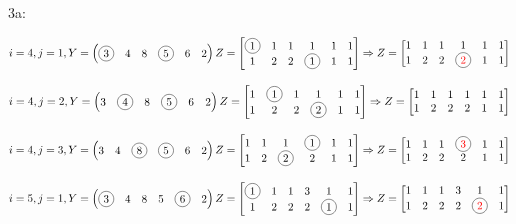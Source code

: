 \begin{example}{}{}
	3a:

	$i = 4, j = 1, Y = \begin{pmatrix} \circled{3} & 4 & 8 & \circled{5} & 6 & 2 \end{pmatrix} \\
	Z = \begin{bmatrix}
		\circled{1} & 1 & 1 & 1 & 1 & 1 \\
		1 & 2 & 2 & \circled{1} & 1 & 1
	\end{bmatrix} \Rightarrow Z = \begin{bmatrix}
		1 & 1 & 1 & 1 & 1 & 1 \\
		1 & 2 & 2 & \circled{\textcolor{red}{2}} & 1 & 1
	\end{bmatrix}$

	$i = 4, j = 2, Y = \begin{pmatrix} 3 & \circled{4} & 8 & \circled{5} & 6 & 2 \end{pmatrix} \\
	Z = \begin{bmatrix}
		1 & \circled{1} & 1 & 1 & 1 & 1 \\
		1 & 2 & 2 & \circled{2} & 1 & 1
	\end{bmatrix} \Rightarrow Z = \begin{bmatrix}
		1 & 1 & 1 & 1 & 1 & 1 \\
		1 & 2 & 2 & 2 & 1 & 1
	\end{bmatrix}$

	$i = 4, j = 3, Y = \begin{pmatrix} 3 & 4 & \circled{8} & \circled{5} & 6 & 2 \end{pmatrix} \\
	Z = \begin{bmatrix}
		1 & 1 & 1 & \circled{1} & 1 & 1 \\
		1 & 2 & \circled{2} & 2 & 1 & 1
	\end{bmatrix} \Rightarrow Z = \begin{bmatrix}
		1 & 1 & 1 & \circled{\textcolor{red}{3}} & 1 & 1 \\
		1 & 2 & 2 & 2 & 1 & 1
	\end{bmatrix}$

	$i = 5, j = 1, Y = \begin{pmatrix} \circled{3} & 4 & 8 & 5 & \circled{6} & 2 \end{pmatrix} \\
	Z = \begin{bmatrix}
		\circled{1} & 1 & 1 & 3 & 1 & 1 \\
		1 & 2 & 2 & 2 & \circled{1} & 1
	\end{bmatrix} \Rightarrow Z = \begin{bmatrix}
		1 & 1 & 1 & 3 & 1 & 1 \\
		1 & 2 & 2 & 2 & \circled{\textcolor{red}{2}} & 1
	\end{bmatrix}$


\end{example}
